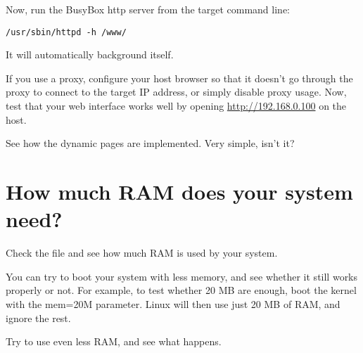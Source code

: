 Now, run the BusyBox http server from the target command line:

\begin{verbatim}
/usr/sbin/httpd -h /www/
\end{verbatim}

It will automatically background itself.

If you use a proxy, configure your host browser so that it doesn't go
through the proxy to connect to the target IP address, or simply
disable proxy usage.  Now, test that your web interface works well by
opening \url{http://192.168.0.100} on the host.

See how the dynamic pages are implemented. Very simple, isn't it?

\section{How much RAM does your system need?}

Check the  file and see how much RAM is used by your
system.

You can try to boot your system with less memory, and see whether it
still works properly or not. For example, to test whether 20 MB are
enough, boot the kernel with the mem=20M parameter. Linux will then
use just 20 MB of RAM, and ignore the rest.

Try to use even less RAM, and see what happens.
